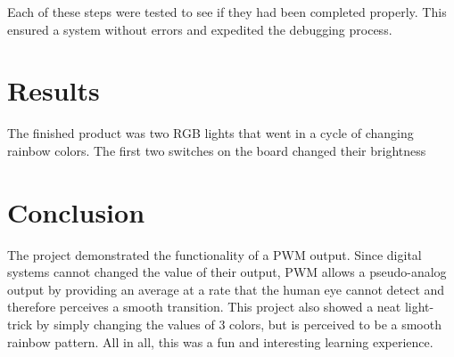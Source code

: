 \documentclass[11pt]{article}
\begin{document}
\quad Each of these steps were tested to see if they had been completed properly. This ensured a system without errors and expedited the debugging process.

\section{Results}
\quad The finished product was two RGB lights that went in a cycle of changing rainbow colors. The first two switches on the board changed their brightness
\section{Conclusion}
\quad The project demonstrated the functionality of a PWM output. Since digital systems cannot changed the value of their output, PWM allows a pseudo-analog output by providing an average at a rate that the human eye cannot detect and therefore perceives a smooth transition. This project also showed a neat light-trick by simply changing the values of 3 colors, but is perceived to be a smooth rainbow pattern. All in all, this was a fun and interesting learning experience. 
\end{document}
